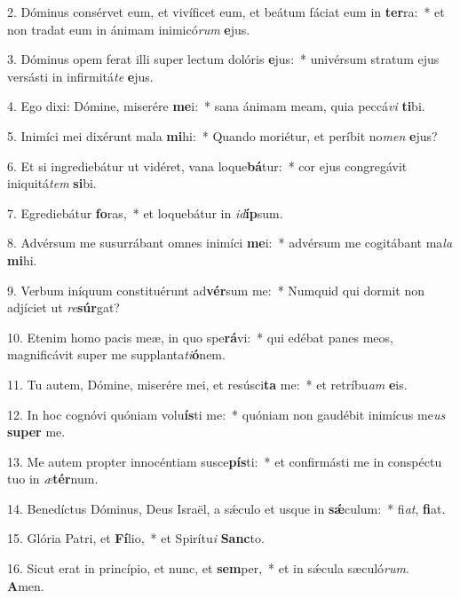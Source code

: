 2. Dóminus consérvet eum, et vivíficet eum, et beátum fáciat eum in \textbf{ter}ra:~*  et non tradat eum in ánimam inimicó\textit{rum} \textbf{e}jus.\

3. Dóminus opem ferat illi super lectum dolóris \textbf{e}jus:~*  univérsum stratum ejus versásti in infirmitá\textit{te} \textbf{e}jus.\

4. Ego dixi: Dómine, miserére \textbf{me}i:~*  sana ánimam meam, quia peccá\textit{vi} \textbf{ti}bi.\

5. Inimíci mei dixérunt mala \textbf{mi}hi:~*  Quando moriétur, et períbit no\textit{men} \textbf{e}jus?\

6. Et si ingrediebátur ut vidéret, vana loque\textbf{bá}tur:~*  cor ejus congregávit iniquitá\textit{tem} \textbf{si}bi.\

7. Egrediebátur \textbf{fo}ras,~*  et loquebátur in \textit{id}\textbf{íp}sum.\

8. Advérsum me susurrábant omnes inimíci \textbf{me}i:~*  advérsum me cogitábant ma\textit{la} \textbf{mi}hi.\

9. Verbum iníquum constituérunt ad\textbf{vér}sum me:~*  Numquid qui dormit non adjíciet ut \textit{re}\textbf{súr}gat?\

10. Etenim homo pacis meæ, in quo spe\textbf{rá}vi:~*  qui edébat panes meos, magnificávit super me supplanta\textit{ti}\textbf{ó}nem.\

11. Tu autem, Dómine, miserére mei, et resúsci\textbf{ta} me:~*  et retríbu\textit{am} \textbf{e}is.\

12. In hoc cognóvi quóniam volu\textbf{ís}ti me:~*  quóniam non gaudébit inimícus me\textit{us} \textbf{su}\textbf{per} me.\

13. Me autem propter innocéntiam susce\textbf{pís}ti:~*  et confirmásti me in conspéctu tuo in \textit{æ}\textbf{tér}num.\

14. Benedíctus Dóminus, Deus Israël, a sǽculo et usque in \textbf{sǽ}culum:~*  fi\textit{at}, \textbf{fi}at.\

15. Glória Patri, et \textbf{Fí}lio,~*  et Spirítu\textit{i} \textbf{Sanc}to.\

16. Sicut erat in princípio, et nunc, et \textbf{sem}per,~*  et in sǽcula sæculó\textit{rum}. \textbf{A}men.\


